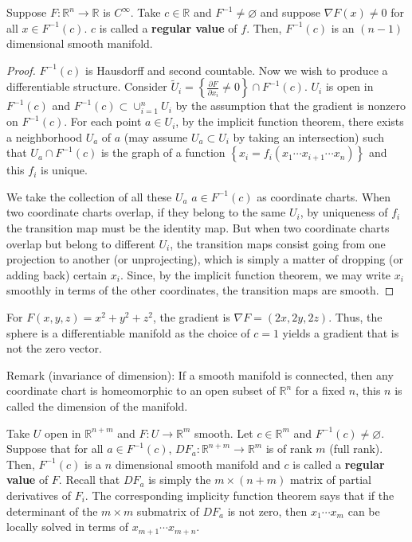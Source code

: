 \documentclass{mathnotes}
\begin{document}
\begin{thm}
    Suppose $F:\mathbb{R}^n\to\mathbb{R}$ is $C^\infty$. Take $c\in\mathbb{R}$ and $F^{-1}\neq \varnothing$ and suppose $\nabla F(x)\neq0$ for all $x\in F^{-1}(c)$. $c$ is called
    a \textbf{regular value} of $f$. Then, $F^{-1}(c)$ is an $(n-1)$ dimensional smooth manifold.
\end{thm}
\begin{proof}
    $F^{-1}(c)$ is Hausdorff and second countable. Now we wish to produce a differentiable structure. Consider $\tilde{U}_i=\left\{ \frac{\partial F}{\partial x_i}\neq0 \right\}\cap F^{-1}(c)$.
    $U_i$ is open in $F^{-1}(c)$ and $F^{-1}(c)\subset\cup_{i=1}^nU_i$ by the assumption that the gradient is nonzero on $F^{-1}(c)$. For each point $a\in U_i$, by the
    implicit function theorem, there exists a neighborhood $U_a$ of $a$ (may assume $U_a\subset U_i$ by taking an intersection) such that $U_a\cap F^{-1}(c)$ is the graph
    of a function $\left\{ x_i=f_i(x_1\cdots x_{i+1}\cdots x_n) \right\}$ and this $f_i$ is unique.

    We take the collection of all these $U_a$ $a\in F^{-1}(c)$ as coordinate charts. When two coordinate charts overlap, if they belong to the same $U_i$, by uniqueness
    of $f_i$ the transition map must be the identity map. But when two coordinate charts overlap but belong to different $U_i$, the transition maps consist 
    going from one projection to another (or unprojecting), which is simply a matter of dropping (or adding back) certain $x_i$. Since, by the implicit function theorem, 
    we may write $x_i$ smoothly in terms of the other coordinates, the transition maps are smooth.
\end{proof}

For $F(x,y,z)=x^2+y^2+z^2$, the gradient is $\nabla F=(2x, 2y, 2z)$. Thus, the sphere is a differentiable manifold as the choice of $c=1$ yields a gradient
that is not the zero vector.

Remark (invariance of dimension): If a smooth manifold is connected, then any coordinate chart is homeomorphic to an open subset of $\mathbb{R}^n$ for a fixed $n$, this $n$ is called
the dimension of the manifold.

\begin{thm}
    Take $U$ open in $\mathbb{R}^{n+m}$ and $F:U\to\mathbb{R}^m$ smooth. Let $c\in\mathbb{R}^m$ and $F^{-1}(c)\neq\varnothing$. Suppose that for all $a\in F^{-1}(c)$,
    $DF_a:\mathbb{R}^{n+m}\to\mathbb{R}^m$ is of rank $m$ (full rank). Then, $F^{-1}(c)$ is a $n$ dimensional smooth manifold and $c$ is called a \textbf{regular value}
    of $F$. Recall that $DF_a$ is simply the $m\times(n+m)$ matrix of partial derivatives of $F_i$. The corresponding implicity function theorem says that if
    the determinant of the $m\times m$ submatrix of $DF_a$ is not zero, then $x_1\cdots x_m$ can be locally solved in terms of $x_{m+1}\cdots x_{m+n}$.
\end{thm}
\end{document}

